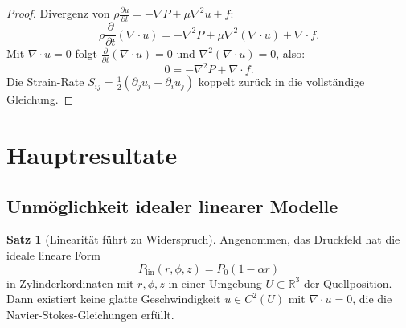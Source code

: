 \documentclass[a4paper,12pt]{article}
\theoremstyle{definition}
\newtheorem{satz}{Satz}
\begin{document}
\begin{proof}
Divergenz von $\rho \frac{\partial u}{\partial t} = -\nabla P + \mu \nabla^2 u + f$:
\[
\rho \frac{\partial}{\partial t}(\nabla \cdot u) = -\nabla^2 P + \mu \nabla^2 (\nabla \cdot u) + \nabla \cdot f.
\]
Mit $\nabla \cdot u = 0$ folgt $\frac{\partial}{\partial t}(\nabla \cdot u) = 0$ und $\nabla^2(\nabla \cdot u) = 0$, also:
\[
0 = -\nabla^2 P + \nabla \cdot f.
\]
Die Strain-Rate $S_{ij} = \frac{1}{2}(\partial_j u_i + \partial_i u_j)$ koppelt zurück in die vollständige Gleichung.
\end{proof}

\section{Hauptresultate}

\subsection{Unmöglichkeit idealer linearer Modelle}

\begin{satz}[Linearität führt zu Widerspruch]
\label{satz:linear-contradiction}
Angenommen, das Druckfeld hat die ideale lineare Form
\[
P_{\text{lin}}(r, \phi, z) = P_0 (1 - \alpha r)
\]
in Zylinderkordinaten mit $r, \phi, z$ in einer Umgebung $U \subset \mathbb{R}^3$ der Quellposition. Dann existiert keine glatte Geschwindigkeit $u \in C^2(U)$ mit $\nabla \cdot u = 0$, die die Navier-Stokes-Gleichungen erfüllt.
\end{satz}
\end{document}
